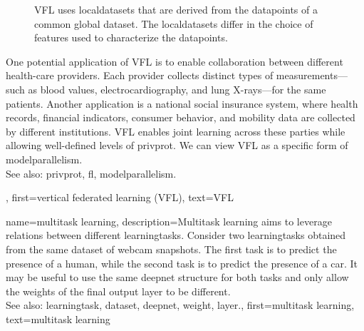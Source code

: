 {{\begin{figure}[H]
\begin{center}
			\end{center}
		\caption{VFL uses \glspl{localdataset} that are derived from the \glspl{datapoint} of a common global \gls{dataset}. 
			The \glspl{localdataset} differ in the choice of \glspl{feature} used to characterize 
			the \glspl{datapoint}.\label{fig_vertical_FL_dict}}
		\end{figure}
		One potential application of VFL is to enable collaboration between 
		different health-care providers. Each provider collects distinct types of measurements—such as blood 
		values, electrocardiography, and lung X-rays—for the same patients. Another 
		application is a national social insurance system, where health records, financial 
		indicators, consumer behavior, and mobility \gls{data} are collected by different 
		institutions. VFL enables joint learning across these parties while allowing 
		well-defined levels of \gls{privprot}. We can view VFL as a specific form of
		\gls{modelparallelism}.
		\\
		See also: \gls{privprot}, \gls{fl}, \gls{modelparallelism}.},
	first={vertical federated learning (VFL)},
	text={VFL}
}

{name={multitask learning},
	description={Multitask learning aims to leverage relations between 
	 	different \glspl{learningtask}. Consider two \glspl{learningtask} obtained from the 
	 	same \gls{dataset} of webcam snapshots. The first task is to predict the presence 
	 	of a human, while the second task is to predict the presence of a car. It may be useful 
	 	to use the same \gls{deepnet} structure for both tasks and only allow the \glspl{weight} of 
	 	the final \gls{output} \gls{layer} to be different.
	 			\\ 
		See also: \gls{learningtask}, \gls{dataset}, \gls{deepnet}, \gls{weight}, \gls{layer}.},
	first={multitask learning},
	text={multitask learning}
}


